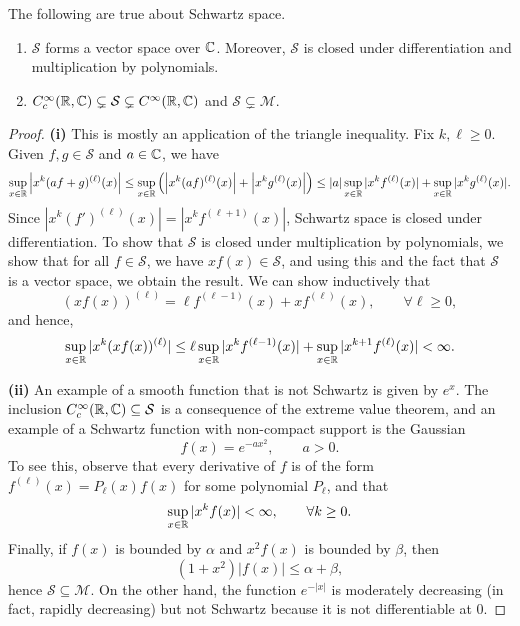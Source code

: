 \documentclass[11pt, letterpaper]{aq-notes}
\newcommand{\schwartz}{\mathcal{S}}
\begin{document}
\begin{proposition}\label{prop:schwartz-prop}
	The following are true about Schwartz space.
	\begin{enumerate}[label=(\roman*)]
		\item $\schwartz$ forms a vector space over $\mathbb{C}$. Moreover, $\schwartz$ is closed under differentiation and multiplication by polynomials.
		\item $C^\infty_c(\R, \C) \subsetneq \schwartz \subsetneq C^\infty(\R, \C)$ and $\schwartz \subsetneq \mathcal{M}$.
	\end{enumerate}
\end{proposition}

\begin{proof}
	\textbf{(i)} This is mostly an application of the triangle inequality. Fix $k, \ell \geq 0$. Given $f, g \in \schwartz$ and $a \in \mathbb{C}$, we have
	\[
		\sup_{x \in \mathbb{R}} \left|x^k(af + g)^{(\ell)}(x)\right| \leq \sup_{x \in \mathbb{R}} \left(\left|x^k(af)^{(\ell)}(x)\right| + \left|x^kg^{(\ell)}(x)\right|\right) \leq |a|\sup_{x \in \mathbb{R}} |x^kf^{(\ell)}(x)| + \sup_{x \in \mathbb{R}} |x^kg^{(\ell)}(x)|.
	\]
	Since $|x^k(f')^{(\ell)}(x)| = |x^kf^{(\ell + 1)}(x)|$, Schwartz space is closed under differentiation. To show that $\schwartz$ is closed under multiplication by polynomials, we show that for all $f \in \schwartz$, we have $xf(x) \in \schwartz$, and using this and the fact that $\schwartz$ is a vector space, we obtain the result. We can show inductively that
	\[
		(xf(x))^{(\ell)} = \ell f^{(\ell - 1)}(x) + xf^{(\ell)}(x), \qquad \forall \ell \geq 0,
	\]
	and hence,
	\[
		\sup_{x \in \mathbb{R}} |x^k(xf(x))^{(\ell)}| \leq \ell\sup_{x \in \mathbb{R}}|x^kf^{(\ell - 1)}(x)| + \sup_{x \in \mathbb{R}}|x^{k + 1}f^{(\ell)}(x)| < \infty.
	\]

	\textbf{(ii)} An example of a smooth function that is not Schwartz is given by $e^x$. The inclusion $C^\infty_c(\R, \C) \subseteq \schwartz$ is a consequence of the extreme value theorem, and an example of a Schwartz function with non-compact support is the Gaussian
	\[
		f(x) = e^{-ax^2}, \qquad a > 0.
	\]
	To see this, observe that every derivative of $f$ is of the form $f^{(\ell)}(x) = P_\ell(x)f(x)$ for some polynomial $P_\ell$, and that
	\[
		\sup_{x \in \mathbb{R}} |x^kf(x)| < \infty, \qquad \forall k \geq 0.
	\]
	Finally, if $f(x)$ is bounded by $\alpha$ and $x^2f(x)$ is bounded by $\beta$, then
	\[
		(1 + x^2)|f(x)| \leq \alpha + \beta,
	\]
	hence $\schwartz \subseteq \mathcal{M}$. On the other hand, the function $e^{-|x|}$ is moderately decreasing (in fact, rapidly decreasing) but not Schwartz because it is not differentiable at $0$.
\end{proof}
\end{document}
